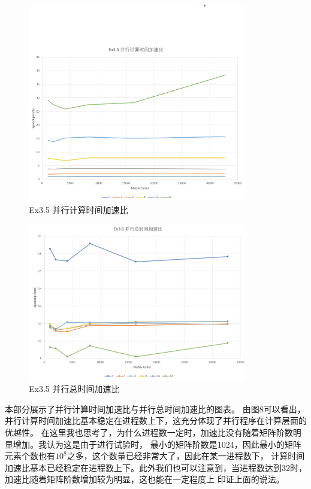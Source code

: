 \documentclass[UTF8]{article}
\begin{document}
    \begin{figure}[h]
    \centering
        \includegraphics[width=0.85\textwidth]{35pct.png}
        \caption{Ex3.5 并行计算时间加速比}
    \end{figure}
    \begin{figure}[h]
    \centering
        \includegraphics[width=0.85\textwidth]{35pat.png}
        \caption{Ex3.5 并行总时间加速比}
    \end{figure}
    本部分展示了并行计算时间加速比与并行总时间加速比的图表。
    由图8可以看出，并行计算时间加速比基本稳定在进程数上下，这充分体现了并行程序在计算层面的优越性。
    在这里我也思考了，为什么进程数一定时，加速比没有随着矩阵阶数明显增加。我认为这是由于进行试验时，
    最小的矩阵阶数是1024，因此最小的矩阵元素个数也有$10^8$之多，这个数量已经非常大了，因此在某一进程数下，
    计算时间加速比基本已经稳定在进程数上下。此外我们也可以注意到，当进程数达到32时，加速比随着矩阵阶数增加较为明显，这也能在一定程度上
    印证上面的说法。\\\\
\end{document}
